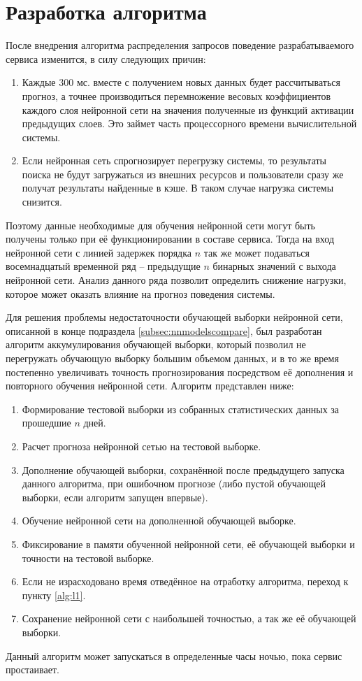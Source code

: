 \documentclass[a4paper,14pt,russian]{extreport}
\begin{document}
\section{Разработка алгоритма} \label{sec:algdevelopment}
После внедрения алгоритма распределения запросов поведение 
разрабатываемого сервиса изменится, в силу следующих причин:
\begin{enumerate}
	\item Каждые 300 мс. вместе с получением новых данных будет 
		рассчитываться прогноз, а точнее производиться перемножение 
		весовых коэффициентов каждого слоя нейронной сети на значения 
		полученные из функций активации предыдущих слоев. Это займет 
		часть процессорного времени вычислительной системы.
	\item Если нейронная сеть спрогнозирует перегрузку системы, то 
		результаты поиска не будут загружаться из внешних ресурсов и 
		пользователи сразу же получат результаты найденные в кэше. В 
		таком случае нагрузка системы снизится. 
\end{enumerate}
Поэтому данные необходимые для обучения нейронной сети могут быть 
получены только при её функционировании в составе сервиса. Тогда 
на вход нейронной сети с линией задержек порядка $n$ так же может 
подаваться восемнадцатый временной ряд -- предыдущие $n$ бинарных 
значений с выхода нейронной сети. Анализ данного ряда позволит определить 
снижение нагрузки, которое может оказать влияние на прогноз поведения 
системы. 

Для решения проблемы недостаточности обучающей выборки нейронной сети, 
описанной в конце подраздела \ref{subsec:nnmodelscompare}, был разработан 
алгоритм аккумулирования обучающей выборки, который позволил не 
перегружать обучающую выборку большим объемом данных, и в то же время 
постепенно увеличивать точность прогнозирования посредством её дополнения и 
повторного обучения нейронной сети. Алгоритм представлен ниже:
\begin{enumerate}
	\item Формирование тестовой выборки из собранных статистических 
		данных за прошедшие $n$ дней.
	\item \label{alg:l1} Расчет прогноза нейронной сетью на тестовой выборке.
	\item Дополнение обучающей выборки, сохранённой после предыдущего 
		запуска данного алгоритма, при ошибочном прогнозе (либо пустой 
		обучающей выборки, если алгоритм запущен впервые). 
	\item Обучение нейронной сети на дополненной обучающей выборке.
	\item \label{alg:l2} Фиксирование в памяти обученной нейронной сети, её 
		обучающей выборки и точности на тестовой выборке.
	\item Если не израсходовано время отведённое на отработку алгоритма, 
		переход к пункту \ref{alg:l1}.
	\item Сохранение нейронной сети с наибольшей точностью, а так же её 
		обучающей выборки.
\end{enumerate}
Данный алгоритм может запускаться в определенные часы ночью, пока сервис 
простаивает.
\end{document}

